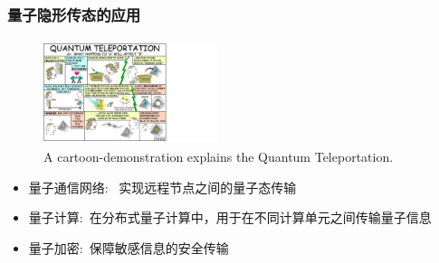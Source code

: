 \begin{frame}
    \frametitle{量子隐形传态的应用}
    \begin{figure}
        \centering
                \includegraphics[height=1.2in, width=2.0in, viewport=0 0 900 710,clip]{Figures/Quantum_Teleportation.jpg}
		\caption{\tiny{\textrm{A cartoon-demonstration explains the Quantum Teleportation.}}}
		\label{Fig:Quantum_Teleportation}
    \end{figure}
    \vskip -10pt
    \begin{itemize}
        \item 量子通信网络:~%
		实现远程节点之间的量子态传输\\
		{\fontsize{7.5pt}{5.2pt}\selectfont{为构建大规模、长距离的量子通信网络奠定基础}}
        \item 量子计算:~在分布式量子计算中，用于在不同计算单元之间传输量子信息\\
		{\fontsize{7.5pt}{5.2pt}\selectfont{提高计算效率和协同性}}
        \item 量子加密:~保障敏感信息的安全传输\\
		{\fontsize{7.5pt}{5.2pt}\selectfont{结合量子隐形传态和量子密钥分发技术，可进一步增强信息传输的安全性}}
    \end{itemize}
\end{frame}


